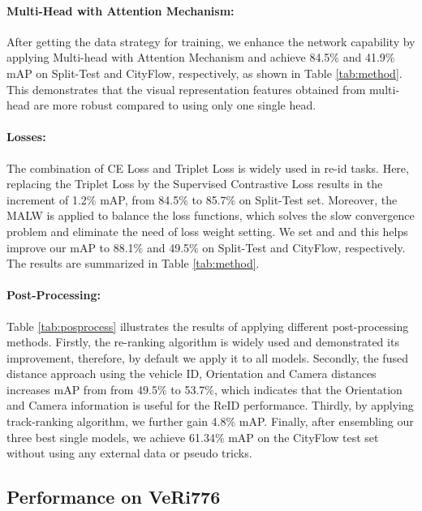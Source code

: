 \documentclass[10pt,twocolumn,letterpaper]{article}
\begin{document}
\paragraph{Multi-Head with Attention Mechanism:} After getting the data strategy for training, we enhance the network capability by applying Multi-head with Attention Mechanism and achieve 84.5\% and  41.9\% mAP on Split-Test and CityFlow, respectively, as shown in Table \ref{tab:method}. This demonstrates that the visual representation features obtained from multi-head are more robust compared to using only one single head.

\paragraph{Losses:} The combination of CE Loss and Triplet Loss is widely used in re-id tasks. Here, replacing the Triplet Loss by the Supervised Contrastive Loss \cite{supcon} results in the increment of 1.2\% mAP, from 84.5\% to 85.7\% on Split-Test set. Moreover, the MALW is applied to balance the loss functions, which solves the slow convergence problem and eliminate the need of loss weight setting. We set  and  and this helps improve our mAP to 88.1\% and 49.5\% on Split-Test and CityFlow, respectively. The results are summarized in Table \ref{tab:method}.

\paragraph{Post-Processing:} Table \ref{tab:posprocess} illustrates the results of applying different post-processing methods. Firstly, the re-ranking algorithm \cite{rerank} is widely used and demonstrated its improvement, therefore, by default we apply it to all models. Secondly, the fused distance approach using the vehicle ID, Orientation and Camera distances \cite{2nd} increases mAP from from 49.5\% to 53.7\%, which indicates that the Orientation and Camera information is useful for the ReID performance. Thirdly, by applying track-ranking algorithm, we further gain 4.8\% mAP. Finally, after ensembling our three best single models, we achieve 61.34\% mAP on the CityFlow test set without using any external data or pseudo tricks.

\subsection{Performance on VeRi776}
\end{document}
